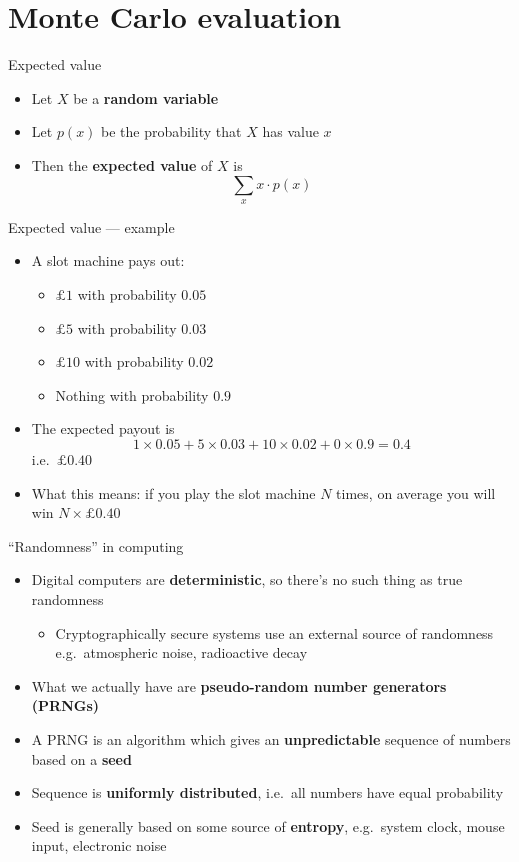 \part{Monte Carlo evaluation}
\frame{\partpage}

\begin{frame}{Expected value}
	\begin{itemize}
		\pause\item Let $X$ be a \textbf{random variable}
		\pause\item Let $p(x)$ be the probability that $X$ has value $x$
		\pause\item Then the \textbf{expected value} of $X$ is
			$$ \sum_x x \cdot p(x) $$
	\end{itemize}
\end{frame}

\begin{frame}{Expected value --- example}
	\begin{itemize}
		\pause\item A slot machine pays out:
			\begin{itemize}
				\pause\item $\pounds 1$ with probability $0.05$
				\pause\item $\pounds 5$ with probability $0.03$
				\pause\item $\pounds 10$ with probability $0.02$
				\pause\item Nothing with probability $0.9$
			\end{itemize}
		\pause\item The expected payout is
			$$ 1 \times 0.05 + 5 \times 0.03 + 10 \times 0.02 + 0 \times 0.9
				= 0.4 $$
			i.e.\ $\pounds 0.40$
		\pause\item What this means: if you play the slot machine $N$ times, on average you will win $N \times \pounds 0.40$
	\end{itemize}
\end{frame}

\begin{frame}{``Randomness'' in computing}
	\begin{itemize}
		\pause\item Digital computers are \textbf{deterministic}, so there's no such thing as true randomness
			\begin{itemize}
				\pause\item Cryptographically secure systems use an external source of randomness e.g.\ atmospheric noise, radioactive decay
			\end{itemize}
		\pause\item What we actually have are \textbf{pseudo-random number generators (PRNGs)}
		\pause\item A PRNG is an algorithm which gives an \textbf{unpredictable} sequence of numbers based on a \textbf{seed}
		\pause\item Sequence is \textbf{uniformly distributed}, i.e.\ all numbers have equal probability
		\pause\item Seed is generally based on some source of \textbf{entropy}, e.g.\ system clock, mouse input, electronic noise
	\end{itemize}
\end{frame}

